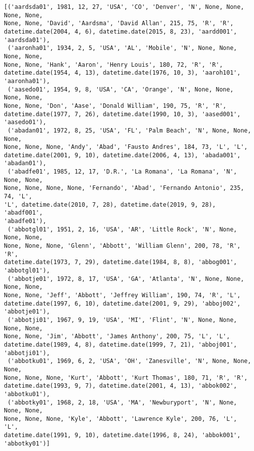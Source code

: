 \documentclass[11pt]{article}
\makeatletter
\newcommand{\boxspacing}{\kern\kvtcb@left@rule\kern\kvtcb@boxsep}
\newcommand{\prompt}[4]{
        {\ttfamily\llap{{\color{#2}[#3]:\hspace{3pt}#4}}\vspace{-\baselineskip}}
    }
\makeatother
\begin{document}
            \begin{tcolorbox}[breakable, size=fbox, boxrule=.5pt, pad at break*=1mm, opacityfill=0]
\prompt{Out}{outcolor}{7}{\boxspacing}
\begin{Verbatim}[commandchars=\\\{\}]
[('aardsda01', 1981, 12, 27, 'USA', 'CO', 'Denver', 'N', None, None, None, None,
None, None, 'David', 'Aardsma', 'David Allan', 215, 75, 'R', 'R',
datetime.date(2004, 4, 6), datetime.date(2015, 8, 23), 'aardd001', 'aardsda01'),
 ('aaronha01', 1934, 2, 5, 'USA', 'AL', 'Mobile', 'N', None, None, None, None,
None, None, 'Hank', 'Aaron', 'Henry Louis', 180, 72, 'R', 'R',
datetime.date(1954, 4, 13), datetime.date(1976, 10, 3), 'aaroh101',
'aaronha01'),
 ('aasedo01', 1954, 9, 8, 'USA', 'CA', 'Orange', 'N', None, None, None, None,
None, None, 'Don', 'Aase', 'Donald William', 190, 75, 'R', 'R',
datetime.date(1977, 7, 26), datetime.date(1990, 10, 3), 'aased001', 'aasedo01'),
 ('abadan01', 1972, 8, 25, 'USA', 'FL', 'Palm Beach', 'N', None, None, None,
None, None, None, 'Andy', 'Abad', 'Fausto Andres', 184, 73, 'L', 'L',
datetime.date(2001, 9, 10), datetime.date(2006, 4, 13), 'abada001', 'abadan01'),
 ('abadfe01', 1985, 12, 17, 'D.R.', 'La Romana', 'La Romana', 'N', None, None,
None, None, None, None, 'Fernando', 'Abad', 'Fernando Antonio', 235, 74, 'L',
'L', datetime.date(2010, 7, 28), datetime.date(2019, 9, 28), 'abadf001',
'abadfe01'),
 ('abbotgl01', 1951, 2, 16, 'USA', 'AR', 'Little Rock', 'N', None, None, None,
None, None, None, 'Glenn', 'Abbott', 'William Glenn', 200, 78, 'R', 'R',
datetime.date(1973, 7, 29), datetime.date(1984, 8, 8), 'abbog001', 'abbotgl01'),
 ('abbotje01', 1972, 8, 17, 'USA', 'GA', 'Atlanta', 'N', None, None, None, None,
None, None, 'Jeff', 'Abbott', 'Jeffrey William', 190, 74, 'R', 'L',
datetime.date(1997, 6, 10), datetime.date(2001, 9, 29), 'abboj002',
'abbotje01'),
 ('abbotji01', 1967, 9, 19, 'USA', 'MI', 'Flint', 'N', None, None, None, None,
None, None, 'Jim', 'Abbott', 'James Anthony', 200, 75, 'L', 'L',
datetime.date(1989, 4, 8), datetime.date(1999, 7, 21), 'abboj001', 'abbotji01'),
 ('abbotku01', 1969, 6, 2, 'USA', 'OH', 'Zanesville', 'N', None, None, None,
None, None, None, 'Kurt', 'Abbott', 'Kurt Thomas', 180, 71, 'R', 'R',
datetime.date(1993, 9, 7), datetime.date(2001, 4, 13), 'abbok002', 'abbotku01'),
 ('abbotky01', 1968, 2, 18, 'USA', 'MA', 'Newburyport', 'N', None, None, None,
None, None, None, 'Kyle', 'Abbott', 'Lawrence Kyle', 200, 76, 'L', 'L',
datetime.date(1991, 9, 10), datetime.date(1996, 8, 24), 'abbok001',
'abbotky01')]
\end{Verbatim}
\end{tcolorbox}
        
\end{document}
